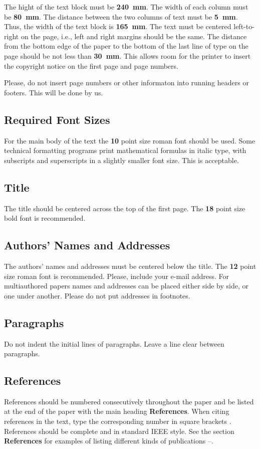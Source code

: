 \documentclass{physcon}
\begin{document}
The hight of the text block must be {\bf 240~mm}.
The width of each column must be {\bf 80~mm}.
The distance between the two columns of text 
must be {\bf 5~mm}. Thus, the width of the text block
is {\bf 165~mm}.
The text must be centered left-to-right 
on the page, i.e., left and right margins 
should be the same.
The distance from the bottom 
edge of the paper to the bottom of the last 
line of type on the page should be not less than {\bf 30~mm}.  
This allows room for the printer to 
insert the copyright notice on the first page 
and page numbers.

Please, do not insert page numbers or other informaton into
running headers or footers. This will be done by us.

\subsection{Required Font Sizes}

For the main body of the text the {\bf 10} point size roman font
should be used. 
Some technical formatting programs print 
mathematical formulas in italic type, with subscripts and 
superscripts in a slightly smaller font size. This is acceptable.

\subsection{Title} The title should be centered across the top 
of the first page. The {\bf 18} point size bold font is recommended.

\subsection{Authors' Names and Addresses} The authors' names and
addresses must be centered below the title. The {\bf 12} point 
size roman font is recommended. Please, 
include your e-mail address. 
For multiauthored papers names and addresses can be placed
either side by side, or one under another. Please do not
put addresses in footnotes.

\subsection{Paragraphs}
Do not indent the initial lines of paragraphs. 
Leave a line clear between paragraphs.

\subsection{References} References should be numbered
consecutively throughout the paper and be listed at the end
of the paper with the main heading {\bf References}. 
When citing references in the text, type the
corresponding number in square brackets \cite{1}. 
References should be complete and in standard IEEE style.
See the section {\bf References} for examples of listing
different kinds of publications \cite{1}--\cite{3}.
\end{document}
